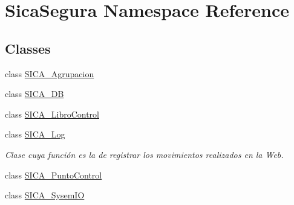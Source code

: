\hypertarget{namespace_sica_segura}{}\section{Sica\+Segura Namespace Reference}
\label{namespace_sica_segura}
\subsection*{Classes}
\begin{DoxyCompactItemize}
\item 
class \hyperlink{class_sica_segura_1_1_s_i_c_a___agrupacion}{S\+I\+C\+A\+\_\+\+Agrupacion}
\item 
class \hyperlink{class_sica_segura_1_1_s_i_c_a___d_b}{S\+I\+C\+A\+\_\+\+DB}
\item 
class \hyperlink{class_sica_segura_1_1_s_i_c_a___libro_control}{S\+I\+C\+A\+\_\+\+Libro\+Control}
\item 
class \hyperlink{class_sica_segura_1_1_s_i_c_a___log}{S\+I\+C\+A\+\_\+\+Log}
\begin{DoxyCompactList}\small\item\em Clase cuya función es la de registrar los movimientos realizados en la Web. \end{DoxyCompactList}\item 
class \hyperlink{class_sica_segura_1_1_s_i_c_a___punto_control}{S\+I\+C\+A\+\_\+\+Punto\+Control}
\item 
class \hyperlink{class_sica_segura_1_1_s_i_c_a___sysem_i_o}{S\+I\+C\+A\+\_\+\+Sysem\+IO}
\end{DoxyCompactItemize}
